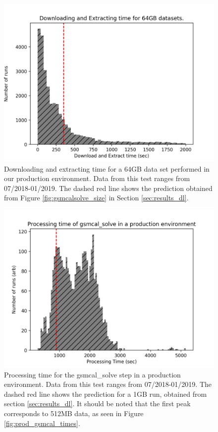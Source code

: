 \documentclass[preprint,5p]{elsarticle}
\begin{document}
\begin{figure}
    \includegraphics[width=0.95\linewidth]{figures/Production_64GB.png}
      \caption{Downloading and extracting time for a 64GB data set performed in our production environment. Data from this test ranges from 07/2018-01/2019. The dashed red line shows the prediction obtained from Figure \ref{fig:gsmcalsolve_size} in Section \ref{sec:results_dl}. }
	\label{fig:prod_dl_64}
\end{figure}


\begin{figure}
    \includegraphics[width=0.95\linewidth]{figures/Production_gsmcal_1GB.png}
      \caption{Processing time for the gsmcal\_solve step in a production environment. Data from this test ranges from 07/2018-01/2019. The dashed red line shows the prediction for a 1GB run, obtained from section \ref{sec:results_dl}. It should be noted that the first peak corresponds to 512MB data, as seen in Figure \ref{fig:prod_gsmcal_times}.}
	\label{fig:prod_gsmcal}
\end{figure}
\end{document}
